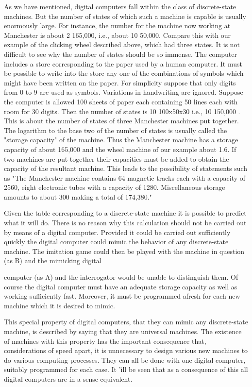 \documentclass{article}
\begin{document}
As we have mentioned, digital computers fall within the class of discrete-state machines. But the number of states of which such a machine is capable is usually enormously large. For instance, the number for the machine now working at Manchester is about 2 165,000, i.e., about 10 50,000. Compare this with our example of the clicking wheel described above, which had three states. It is not difficult to see why the number of states should be so immense. The computer includes a store corresponding to the paper used by a human computer. It must be possible to write into the store any one of the combinations of symbols which might have been written on the paper. For simplicity suppose that only digits from 0 to 9 are used as symbols. Variations in handwriting are ignored. Suppose the computer is allowed 100 sheets of paper each containing 50 lines each with room for 30 digits. Then the number of states is 10 100x50x30 i.e., 10 150,000 . This is about the number of states of three Manchester machines put together. The logarithm to the base two of the number of states is usually called the "storage capacity" of the machine. Thus the Manchester machine has a storage capacity of about 165,000 and the wheel machine of our example about 1.6. If two machines are put together their capacities must be added to obtain the capacity of the resultant machine. This leads to the possibility of statements such as "The Manchester machine contains 64 magnetic tracks each with a capacity of 2560, eight electronic tubes with a capacity of 1280. Miscellaneous storage amounts to about 300 making a total of 174,380."

Given the table corresponding to a discrete-state machine it is possible to predict what it will do. There is no reason why this calculation should not be carried out by means of a digital computer. Provided it could be carried out sufficiently quickly the digital computer could mimic the behavior of any discrete-state machine. The imitation game could then be played with the machine in question (as B) and the mimicking digital

computer (as A) and the interrogator would be unable to distinguish them. Of course the digital computer must have an adequate storage capacity as well as working sufficiently fast. Moreover, it must be programmed afresh for each new machine which it is desired to mimic.

This special property of digital computers, that they can mimic any discrete-state machine, is described by saying that they are universal machines. The existence of machines with this property has the important consequence that, considerations of speed apart, it is unnecessary to design various new machines to do various computing processes. They can all be done with one digital computer, suitably programmed for each case. It 'ill be seen that as a consequence of this all digital computers are in a sense equivalent.
\end{document}
